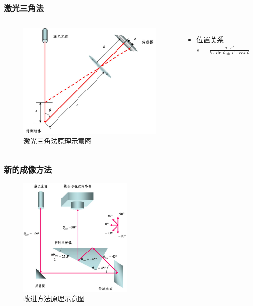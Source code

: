 \documentclass{beamer}
\begin{document}
\begin{frame}
  \frametitle{激光三角法}
  \begin{columns}
  \column{7cm}
        \begin{figure}
        \center
        \includegraphics[width=\textwidth]{image/lasertriangulation}
        \caption{\small 激光三角法原理示意图}
        \end{figure}
  \column{3.5cm}
    \begin{itemize}
    \item
    位置关系\\
    $s=\frac{a\cdot s'}{b\cdot \sin \theta \pm s' \cdot \cos \theta}$
    \end{itemize}
  \end{columns}
\end{frame}

\begin{frame}
  \frametitle{新的成像方法}
        \begin{figure}
        \center
        \includegraphics[width=0.5\textwidth]{image/optics}
        \caption{改进方法原理示意图}
        \end{figure}
\end{frame}
\end{document}

